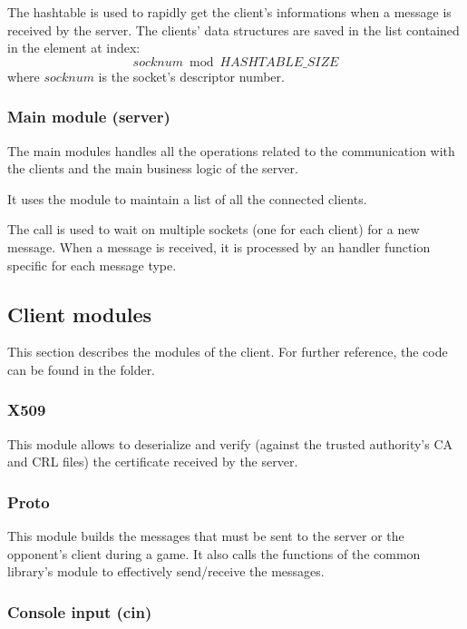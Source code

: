 The hashtable is used to rapidly get the client's informations when a message is
received by the server. The clients' data structures are saved in the list
contained in the element at index: \[socknum \bmod HASHTABLE\_SIZE\] where
\(socknum\) is the socket's descriptor number.

\subsubsection{Main module (server)}

The main modules handles all the operations related to the communication with
the clients and the main business logic of the server.

It uses the  module to maintain a list of all the connected
clients.

The  call is used to wait on multiple sockets (one for each client)
for a new message. When a message is received, it is processed by an handler
function specific for each message type.


\subsection{Client modules}\label{subsec:clientmod}

This section describes the modules of the client. For further reference, the
code can be found in the  folder.

\subsubsection{X509}

This module allows to deserialize and verify (against the trusted authority's CA
and CRL files) the certificate received by the server.

\subsubsection{Proto}

This module builds the messages that must be sent to the server or the
opponent's client during a game. It also calls the functions of the common
library's  module to effectively send/receive the messages.

\subsubsection{Console input (cin)}

